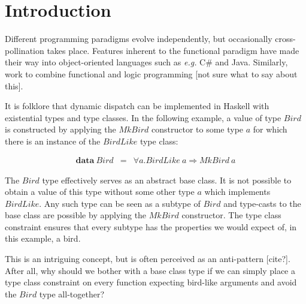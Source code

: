 \documentclass[runningheads,a4paper]{llncs}
\newcommand{\todo}[1]{[{\color{blue}#1}]}
\begin{document}
\section{Introduction}
\label{sec:introduction}

Different programming paradigms evolve independently, but occasionally cross-pollination takes place. Features inherent to the functional paradigm have made their way into object-oriented languages such as \emph{e.g.} C\# and Java. Similarly, work to combine functional and logic programming \todo{not sure what to say about this}.


It is folklore that dynamic dispatch can be implemented in Haskell with existential types and type classes. In the following example, a value of type $\mathit{Bird}$ is constructed by applying the $\mathit{MkBird}$ constructor to some type $a$ for which there is an instance of the $\mathit{BirdLike}$ type class:

\begin{displaymath}
\begin{array}{lcl}
\mathbf{data}~\mathit{Bird} & = & \forall a. \mathit{BirdLike}~a \Rightarrow \mathit{MkBird}~a
\end{array}
\end{displaymath}

The $\mathit{Bird}$ type effectively serves as an abstract base class. It is not possible to obtain a value of this type without some other type $a$ which implements $\mathit{BirdLike}$. Any such type can be seen as a subtype of $\mathit{Bird}$ and type-casts to the base class are possible by applying the $\mathit{MkBird}$ constructor. The type class constraint ensures that every subtype has the properties we would expect of, in this example, a bird.

This is an intriguing concept, but is often perceived as an anti-pattern \todo{cite?}. After all, why should we bother with a base class type if we can simply place a type class constraint on every function expecting bird-like arguments and avoid the $\mathit{Bird}$ type all-together?
\end{document}
